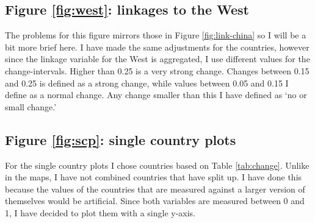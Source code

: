 \subsection{Figure \ref{fig:west}: linkages to the West}
The problems for this figure mirrors those in Figure \ref{fig:link-china} so I will be a bit more brief here. I have made the same adjustments for the countries, however since the linkage variable for the West is aggregated, I use different values for the change-intervals. Higher than 0.25 is a very strong change. Changes between 0.15 and 0.25 is defined as a strong change, while values between 0.05 and 0.15 I define as a normal change. Any change smaller than this I have defined as `no or small change.' 

\subsection{Figure \ref{fig:scp}: single country plots}
For the single country plots I chose countries based on Table \ref{tab:change}. Unlike in the maps, I have not combined countries that have split up. I have done this because the values of the countries that are measured against a larger version of themselves would be artificial. Since both variables are measured between 0 and 1, I have decided to plot them with a single y-axis. 